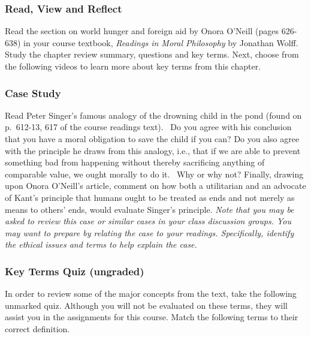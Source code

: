 \documentclass[
]{book}
\begin{document}
\begin{reflect}
\hypertarget{read-view-and-reflect-34}{%
\subsubsection*{Read, View and Reflect}\label{read-view-and-reflect-34}}

Read the section on world hunger and foreign aid by Onora O'Neill (pages 626-638) in your course textbook, \emph{Readings in Moral Philosophy} by Jonathan Wolff. Study the chapter review summary, questions and key terms.
Next, choose from the following videos to learn more about key terms from this chapter.

\hypertarget{case-study-2}{%
\subsubsection*{Case Study}\label{case-study-2}}

Read Peter Singer's famous analogy of the drowning child in the pond (found on p.~612-13, 617 of the course readings text). ~Do you agree with his conclusion that you have a moral obligation to save the child if you can? Do you also agree with the principle he draws from this analogy, i.e., that if we are able to prevent something bad from happening without thereby sacrificing anything of comparable value, we ought morally to do it. ~Why or why not? Finally, drawing upon Onora O'Neill's article, comment on how both a utilitarian and an advocate of Kant's principle that humans ought to be treated as ends and not merely as means to others' ends, would evaluate Singer's principle.
\emph{Note that you may be asked to review this case or similar cases in your class discussion groups. You may want to prepare by relating the case to your readings. Specifically, identify the ethical issues and terms to help explain the case.}

\hypertarget{key-terms-quiz-ungraded-8}{%
\subsubsection*{Key Terms Quiz (ungraded)}\label{key-terms-quiz-ungraded-8}}

In order to review some of the major concepts from the text, take the following unmarked quiz. Although you will not be evaluated on these terms, they will assist you in the assignments for this course.
Match the following terms to their correct definition.
\end{reflect}
\end{document}
